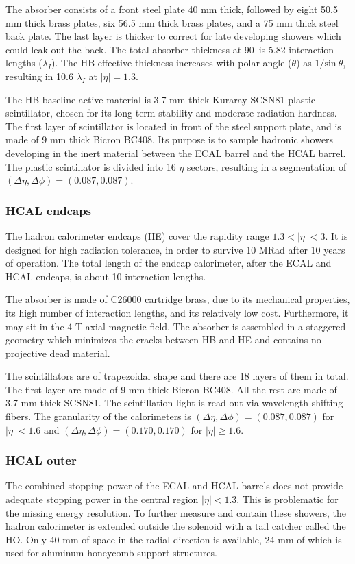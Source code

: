 The absorber consists of a front steel plate 40 mm thick,
followed by eight 50.5 mm thick brass plates, six 56.5 mm thick brass plates,
and a 75 mm thick steel back plate.
The last layer is thicker to correct for late developing showers which could leak out the back.
The total absorber thickness at 90\textdegree~is 5.82 interaction lengths ($\lambda_I$).
The HB effective thickness increases with polar angle ($\theta$) as $1/\textrm{sin}\:\theta$,
resulting in 10.6 $\lambda_I$ at $|\eta| = 1.3$. 

The HB baseline active material is 3.7 mm thick Kuraray SCSN81 plastic scintillator, 
chosen for its long-term stability and moderate radiation hardness. 
The first layer of scintillator is located in front of the steel support plate, 
and is made of 9 mm thick Bicron BC408. 
Its purpose is to sample hadronic showers developing in the inert material between
the ECAL barrel and the HCAL barrel.
The plastic scintillator is divided into 16 $\eta$ sectors, resulting in a segmentation of $(\Delta\eta, \Delta\phi) = (0.087, 0.087)$. 

\subsubsection{HCAL endcaps}

The hadron calorimeter endcaps (HE) cover the rapidity range $1.3 < |\eta| < 3$. 
It is designed for high radiation tolerance, in order to survive 10 MRad after 10 years of operation.
The total length of the endcap calorimeter, after the ECAL and HCAL endcaps, is about 10 interaction lengths. 

The absorber is made of C26000 cartridge brass, due to its mechanical properties, its high number of interaction lengths, and its relatively low cost.
Furthermore, it may sit in the 4 T axial magnetic field.
The absorber is assembled in a staggered geometry which minimizes the cracks between HB and HE and contains no projective dead material. 

The scintillators are of trapezoidal shape and there are 18 layers of them in total. 
The first layer are made of 9 mm thick Bicron BC408. All the rest are made of 3.7 mm thick SCSN81.
The scintillation light is read out via wavelength shifting fibers. 
The granularity of the calorimeters is $(\Delta\eta, \Delta\phi) = (0.087, 0.087)$ for $|\eta| < 1.6$ and $(\Delta\eta, \Delta\phi) = (0.170, 0.170)$ for $|\eta| \geq 1.6$.

\subsubsection{HCAL outer}
The combined stopping power of the ECAL and HCAL barrels does not provide adequate stopping
power in the central region $|\eta| < 1.3$. This is problematic for the missing energy resolution.
To further measure and contain these showers, the hadron calorimeter is extended outside the solenoid with a tail catcher called the HO. Only 40 mm of space in the radial direction is available, 
24 mm of which is used for aluminum honeycomb support structures.

